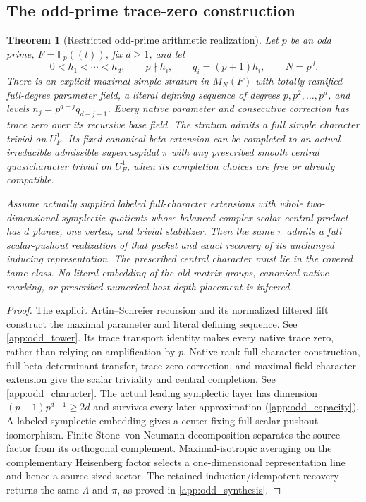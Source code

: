 \documentclass[11pt]{amsart}
\newtheorem{theorem}{Theorem}[section]
\theoremstyle{definition}
\theoremstyle{remark}
\newcommand{\FF}{\mathbb F}
\begin{document}
\subsection{The odd-prime trace-zero construction}

\begin{theorem}[Restricted odd-prime arithmetic realization]
\label{thm:odd_arithmetic}
Let \(p\) be an odd prime, \(F=\FF_p((t))\), fix \(d\ge1\), and let
\[
0<h_1<\cdots<h_d,\qquad p\nmid h_i,
\qquad q_i=(p+1)h_i,\qquad N=p^d.
\]
There is an explicit maximal simple stratum in \(M_N(F)\) with totally
ramified full-degree parameter field, a literal defining sequence of
degrees \(p,p^2,\ldots,p^d\), and levels
\(n_j=p^{d-j}q_{d-j+1}\). Every native parameter and consecutive
correction has trace zero over its recursive base field.
The stratum admits a full simple character trivial on \(U_F^1\).
Its fixed canonical beta extension can be completed to an actual
irreducible admissible supercuspidal \(\pi\) with any prescribed smooth
central quasicharacter trivial on \(U_F^1\), when its completion choices
are free or already compatible.

Assume actually supplied labeled full-character extensions with whole
two-dimensional symplectic quotients whose balanced complex-scalar
central product has \(d\) planes, one vertex, and trivial stabilizer.
Then the same \(\pi\) admits a full scalar-pushout realization of that
packet and exact recovery of its unchanged inducing representation.
The prescribed central character must lie in the covered tame class.
No literal embedding of the old matrix groups, canonical native marking,
or prescribed numerical host-depth placement is inferred.
\end{theorem}

\begin{proof}
The explicit Artin--Schreier recursion and its normalized filtered lift
construct the maximal parameter and literal defining sequence. See
\cref{app:odd_tower}. Its trace transport identity makes every native
trace zero, rather than relying on amplification by \(p\). Native-rank
full-character construction, full beta-determinant transfer, trace-zero
correction, and maximal-field character extension give the scalar
triviality and central completion. See \cref{app:odd_character}.
The actual leading symplectic layer has dimension
\((p-1)p^{d-1}\ge2d\) and survives every later approximation
(\cref{app:odd_capacity}). A labeled symplectic embedding gives a
center-fixing full scalar-pushout isomorphism. Finite Stone--von Neumann
decomposition separates the source factor from its orthogonal
complement. Maximal-isotropic averaging on the complementary Heisenberg
factor selects a one-dimensional representation line and hence a
source-sized sector. The retained induction/idempotent recovery returns the same
\(\Lambda\) and \(\pi\), as proved in \cref{app:odd_synthesis}.
\end{proof}
\end{document}
